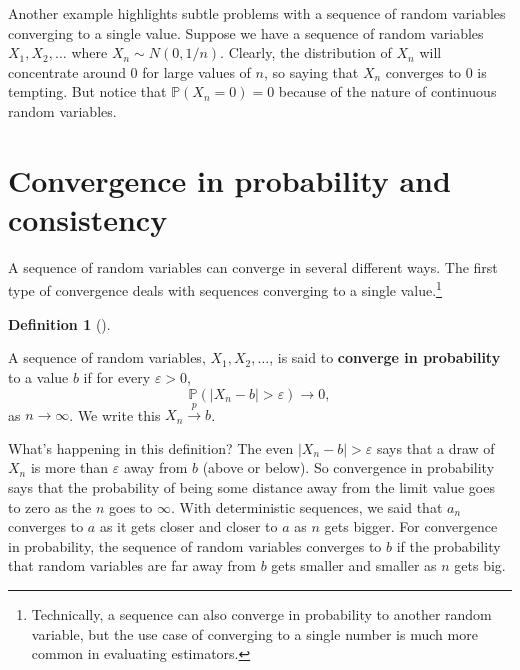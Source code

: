 \documentclass[
  letterpaper,
  DIV=11,
  numbers=noendperiod]{scrreprt}
\renewcommand{\P}{\mathbb{P}}
\newcommand{\inprob}{\overset{p}{\to}}
\theoremstyle{plain}
\theoremstyle{definition}
\newtheorem{definition}{Definition}[chapter]
\theoremstyle{definition}
\theoremstyle{remark}
\begin{document}
Another example highlights subtle problems with a sequence of random
variables converging to a single value. Suppose we have a sequence of
random variables \(X_1, X_2, \ldots\) where \(X_n \sim N(0, 1/n)\).
Clearly, the distribution of \(X_n\) will concentrate around 0 for large
values of \(n\), so saying that \(X_n\) converges to 0 is tempting. But
notice that \(\P(X_n = 0) = 0\) because of the nature of continuous
random variables.

\hypertarget{convergence-in-probability-and-consistency}{%
\section{Convergence in probability and
consistency}\label{convergence-in-probability-and-consistency}}

A sequence of random variables can converge in several different ways.
The first type of convergence deals with sequences converging to a
single value.\footnote{Technically, a sequence can also converge in
  probability to another random variable, but the use case of converging
  to a single number is much more common in evaluating estimators.}

\begin{definition}[]\protect\hypertarget{def-inprob}{}\label{def-inprob}

A sequence of random variables, \(X_1, X_2, \ldots\), is said to
\textbf{converge in probability} to a value \(b\) if for every
\(\varepsilon > 0\), \[
\P(|X_n - b| > \varepsilon) \rightarrow 0,
\] as \(n\rightarrow \infty\). We write this \(X_n \inprob b\).

\end{definition}

What's happening in this definition? The even
\(|X_n - b| > \varepsilon\) says that a draw of \(X_n\) is more than
\(\varepsilon\) away from \(b\) (above or below). So convergence in
probability says that the probability of being some distance away from
the limit value goes to zero as the \(n\) goes to \(\infty\). With
deterministic sequences, we said that \(a_n\) converges to \(a\) as it
gets closer and closer to \(a\) as \(n\) gets bigger. For convergence in
probability, the sequence of random variables converges to \(b\) if the
probability that random variables are far away from \(b\) gets smaller
and smaller as \(n\) gets big.
\end{document}
